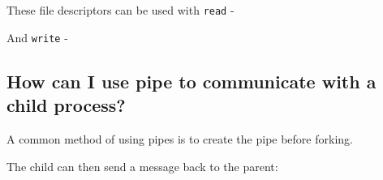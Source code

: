 These file descriptors can be used with \texttt{read} -

\begin{Shaded}
\begin{Highlighting}[]
 \NormalTok{buffer[}\NormalTok{];}
 \NormalTok{bytesread = read(filedes[}\NormalTok{], buffer, }
\end{Highlighting}
\end{Shaded}

And \texttt{write} -

\begin{Shaded}
\begin{Highlighting}[]
\NormalTok{write(filedes[}\NormalTok{], }\NormalTok{, }\NormalTok{);}
\end{Highlighting}
\end{Shaded}

\subsection{How can I use pipe to communicate with a child
process?}\label{how-can-i-use-pipe-to-communicate-with-a-child-process}

A common method of using pipes is to create the pipe before forking.

\begin{Shaded}
\begin{Highlighting}[]
 \NormalTok{filedes[}\NormalTok{];}
 \NormalTok{) \{ }
     \NormalTok{buffer[}\NormalTok{];}
     \NormalTok{bytesread = read(filedes[}\NormalTok{], buffer, }
\NormalTok{\}}
\end{Highlighting}
\end{Shaded}

The child can then send a message back to the parent:

\begin{Shaded}
\begin{Highlighting}[]
 \NormalTok{) \{}
   \NormalTok{write(filedes[}\NormalTok{], }\NormalTok{, }\NormalTok{);}
\NormalTok{\}}
\end{Highlighting}
\end{Shaded}

